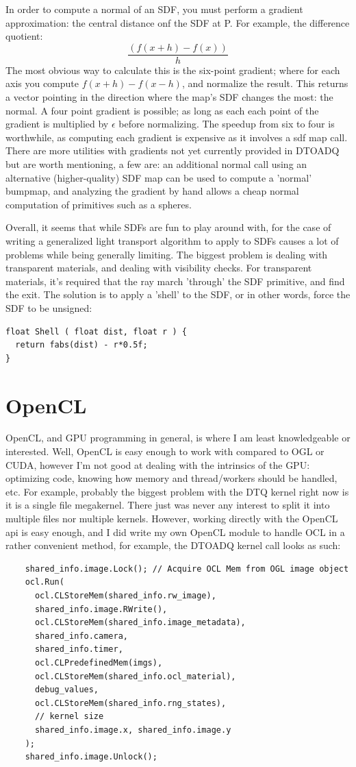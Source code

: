 \documentclass{article}
\begin{document}
  
  In order to compute a normal of an SDF, you must perform a gradient
approximation: the central distance onf the SDF at P. For example, the
difference quotient:
  \[\frac{(f(x+h) - f(x))}{h}\]
  The most obvious way to calculate this is the six-point gradient; where for
each axis you compute $f(x+h) - f(x-h)$, and normalize the result. This
returns a vector pointing in the direction where the map's SDF changes the
most: the normal. A four point gradient is possible; as long as each each
point of the gradient is multiplied by $\epsilon$ before normalizing. The
speedup from six to four is worthwhile, as computing each gradient is
expensive as it involves a sdf map call. There are more utilities with
gradients not yet currently provided in DTOADQ but are worth mentioning, a
few are: an additional normal call using an alternative (higher-quality) SDF
map can be used to compute a 'normal' bumpmap, and analyzing the gradient by
hand allows a cheap normal computation of primitives such as a spheres.


  Overall, it seems that while SDFs are fun to play around with, for the case of
  writing a generalized light transport algorithm to apply to SDFs causes a lot
  of problems while being generally limiting. The biggest problem is dealing
  with transparent materials, and dealing with visibility checks. For
  transparent materials, it's required that the ray march 'through' the SDF
  primitive, and find the exit. The solution is to apply a 'shell' to the SDF,
  or in other words, force the SDF to be unsigned:

\begin{lstlisting}
float Shell ( float dist, float r ) {
  return fabs(dist) - r*0.5f;
}
\end{lstlisting}
  
  \section{OpenCL}
	OpenCL, and GPU programming in general, is where I am least knowledgeable or
interested. Well, OpenCL is easy enough to work with compared to OGL or CUDA,
however I'm not good at dealing with the intrinsics of the GPU: optimizing code,
knowing how memory and thread/workers should be handled, etc. For example,
probably the biggest problem with the DTQ kernel right now is it is a single
file megakernel. There just was never any interest to split it into multiple
files nor multiple kernels. However, working directly with the OpenCL api is
easy enough, and I did write my own OpenCL module
to handle OCL in a rather convenient method, for example, the DTOADQ kernel call
looks as such:
	\begin{lstlisting}
	shared_info.image.Lock(); // Acquire OCL Mem from OGL image object
	ocl.Run(
	  ocl.CLStoreMem(shared_info.rw_image),
	  shared_info.image.RWrite(),
	  ocl.CLStoreMem(shared_info.image_metadata),
	  shared_info.camera,
	  shared_info.timer,
	  ocl.CLPredefinedMem(imgs),
	  ocl.CLStoreMem(shared_info.ocl_material),
	  debug_values,
	  ocl.CLStoreMem(shared_info.rng_states),
	  // kernel size
	  shared_info.image.x, shared_info.image.y
	);
	shared_info.image.Unlock();
	
	\end{lstlisting}
	
\end{document}
